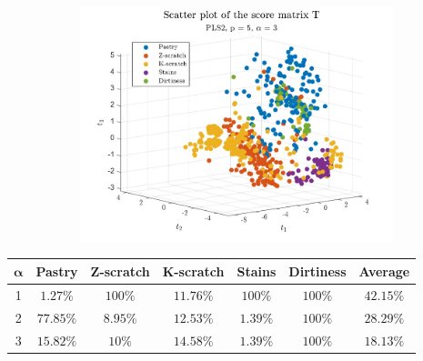 \begin{frame}
	\begin{figure}
		\begin{subfigure}[b]{0.60\textwidth}
			\includegraphics[width=\textwidth]{Images/scatter_T_a3_p5.pdf}
		\end{subfigure}
	\end{figure}
	\begin{table}
		\centering
		\renewcommand\arraystretch{1.3}
		\begin{tabular}{c|c|c|c|c|c|c}
			\hline
			$\boldsymbol{\alpha}$ & \textbf{Pastry} & \textbf{Z-scratch} & \textbf{K-scratch} & \textbf{Stains} & \textbf{Dirtiness} & \textbf{Average}\\
			\hline
			\num{1} & $1.27\%$ & $100\%$ & $11.76\%$ & $100\%$ & $100\%$ & $42.15\%$ \\
			\num{2} & $77.85\%$ & $8.95\%$ & $12.53\%$ & $1.39\%$ & $100\%$ & $28.29\%$ \\
			\num{3} & $15.82\%$ & $10\%$ & $14.58\%$ & $1.39\%$ & $100\%$ & $18.13\%$ \\ 
			\hline
		\end{tabular}
	\end{table}
\end{frame}